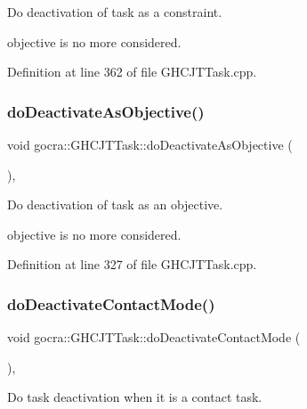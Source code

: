 Do deactivation of task as a constraint.

objective is no more considered. 

Definition at line 362 of file G\+H\+C\+J\+T\+Task.\+cpp.

\hypertarget{classgocra_1_1GHCJTTask_a65593378b928021c5506e2eb6dc9a9c5}{}\label{classgocra_1_1GHCJTTask_a65593378b928021c5506e2eb6dc9a9c5} 
\subsubsection{\texorpdfstring{do\+Deactivate\+As\+Objective()}{doDeactivateAsObjective()}}
{\footnotesize\ttfamily void gocra\+::\+G\+H\+C\+J\+T\+Task\+::do\+Deactivate\+As\+Objective (\begin{DoxyParamCaption}{ }\end{DoxyParamCaption})\hspace{0.3cm}{\ttfamily [protected]}, {\ttfamily [virtual]}}

Do deactivation of task as an objective.

objective is no more considered. 

Definition at line 327 of file G\+H\+C\+J\+T\+Task.\+cpp.

\hypertarget{classgocra_1_1GHCJTTask_a20b391cbb8d62237216624db57d0f634}{}\label{classgocra_1_1GHCJTTask_a20b391cbb8d62237216624db57d0f634} 
\subsubsection{\texorpdfstring{do\+Deactivate\+Contact\+Mode()}{doDeactivateContactMode()}}
{\footnotesize\ttfamily void gocra\+::\+G\+H\+C\+J\+T\+Task\+::do\+Deactivate\+Contact\+Mode (\begin{DoxyParamCaption}{ }\end{DoxyParamCaption})\hspace{0.3cm}{\ttfamily [protected]}, {\ttfamily [virtual]}}

Do task deactivation when it is a contact task.

